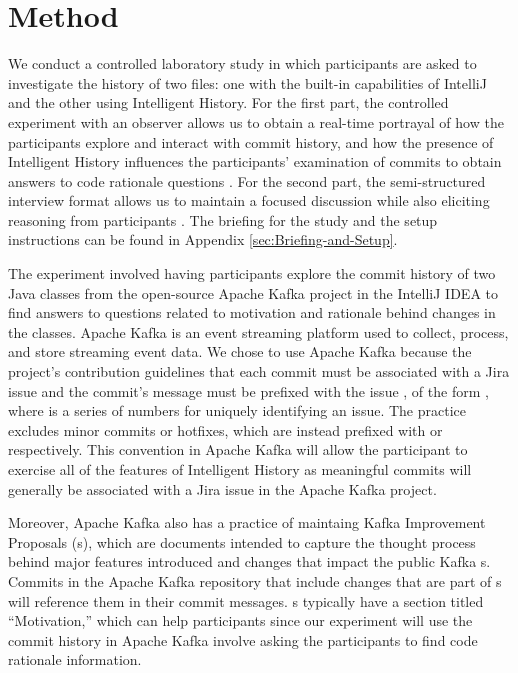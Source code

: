 \section{Method}
\label{sec:Method}

We conduct a controlled laboratory study in which participants are
asked to investigate the history of two files: one with the built-in
capabilities of IntelliJ and the other using Intelligent History.
For the first part, the controlled experiment with an observer allows us to obtain a real-time 
portrayal of how the participants explore and interact with commit history,
and how the presence of Intelligent History influences the participants'
examination of commits to obtain answers to code rationale questions \cite{shull_guide_2007}.
For the second part, the semi-structured interview format allows us to maintain a focused discussion 
while also eliciting reasoning from participants \cite{shull_guide_2007}.
The briefing for the study and the setup instructions can be found in Appendix \ref{sec:Briefing-and-Setup}.

The experiment involved having participants explore the commit history of two Java classes 
from the open-source Apache Kafka project in the IntelliJ IDEA  
to find answers to questions related to motivation and rationale behind changes in the classes.
Apache Kafka is an event streaming platform used to collect, process, and store streaming event data.
We chose to use Apache Kafka because the project's contribution guidelines  that
each commit must be associated with a Jira issue and the commit's message 
must be prefixed with the issue , of the form , 
where  is a series of numbers for uniquely identifying an issue.
The practice excludes minor commits or hotfixes, 
which are instead prefixed with  or  respectively.
This convention in Apache Kafka will allow the participant to exercise all of the features of Intelligent History
as meaningful commits will generally be associated with a Jira issue in the Apache Kafka project.

Moreover, Apache Kafka also has a practice of maintaing Kafka Improvement Proposals (s),
which are documents intended to capture the thought process behind major features introduced 
and changes that impact the public Kafka s.
Commits in the Apache Kafka repository that include changes that are part of s will
reference them in their commit messages.
s typically have a section titled ``Motivation,''
which can help participants since our experiment will use the commit history 
in Apache Kafka  involve asking the participants to find code rationale information.


